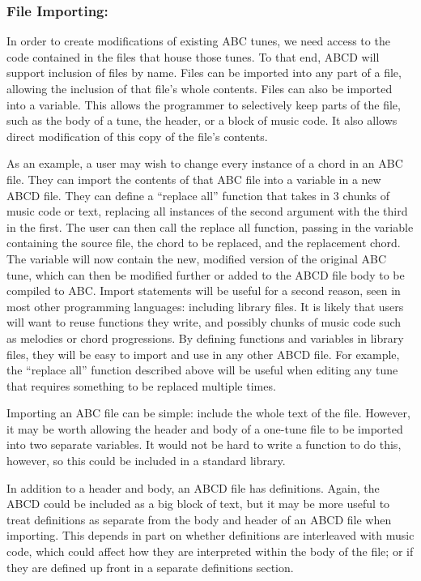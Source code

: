     \subsubsection{File Importing:}
    In order to create modifications of existing ABC tunes, we need access to the code contained in the files that house those tunes. To that end, ABCD will support inclusion of files by name. Files can be imported into any part of a file, allowing the inclusion of that file's whole contents. Files can also be imported into a variable. This allows the programmer to selectively keep parts of the file, such as the body of a tune, the header, or a block of music code. It also allows direct modification of this copy of the file's contents. 
    
    As an example, a user may wish to change every instance of a chord in an ABC file. They can import the contents of that ABC file into a variable in a new ABCD file. They can define a “replace all” function that takes in 3 chunks of music code or text, replacing all instances of the second argument with the third in the first. The user can then call the replace all function, passing in the variable containing the source file, the chord to be replaced, and the replacement chord. The variable will now contain the new, modified version of the original ABC tune, which can then be modified further or added to the ABCD file body to be compiled to ABC.
    Import statements will be useful for a second reason, seen in most other programming languages: including library files. It is likely that users will want to reuse functions they write, and possibly chunks of music code such as melodies or chord progressions. By defining functions and variables in library files, they will be easy to import and use in any other ABCD file. For example, the “replace all” function described above will be useful when editing any tune that requires something to be replaced multiple times.
    
    Importing an ABC file can be simple: include the whole text of the file. However, it may be worth allowing the header and body of a one-tune file to be imported into two separate variables. It would not be hard to write a function to do this, however, so this could be included in a standard library.
    
    In addition to a header and body, an ABCD file has definitions. Again, the ABCD could be included as a big block of text, but it may be more useful to treat definitions as separate from the body and header of an ABCD file when importing. This depends in part on whether definitions are interleaved with music code, which could affect how they are interpreted within the body of the file; or if they are defined up front in a separate definitions section.

